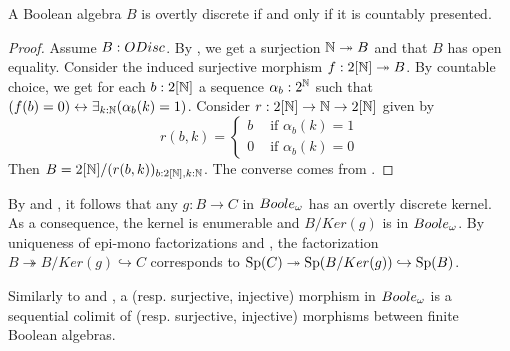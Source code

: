 \begin{corollary}\label{ODiscBAareBoole}
  A Boolean algebra $B$ is overtly discrete if and only if it is countably presented. 
\end{corollary}
\begin{proof}
  Assume $B:\ODisc$. 
  By , we get a surjection $\mathbb{N}\twoheadrightarrow B$ and that $B$ has open equality. 
  Consider the induced surjective morphism $f:2[\mathbb{N}]\twoheadrightarrow B$.
  By countable choice, we get for each $b:2[\mathbb{N}]$
  a sequence $\alpha_{b}:2^{\mathbb{N}}$ such that 
  $(f(b) = 0)\leftrightarrow \exists_{k:\mathbb{N}} (\alpha_{b}(k) =1)$. 
  Consider 
  $r:2[\mathbb{N}] \to \mathbb{N} \to 2[\mathbb{N}]$ 
  given by 
  \[r(b,k) =\begin{cases}
    b &\text{ if } \alpha_{b}(k) = 1\\
    0   &\text{ if } \alpha_{b}(k) = 0
  \end{cases}
  \] 
  Then $B= 2[\mathbb{N}]/(r(b,k))_{b:2[\mathbb{N}],k:\mathbb{N}}$.
  The converse comes from .
\end{proof}

\begin{remark}\label{BooleEpiMono}
  By  and , 
  it follows that any 
  $g:B\to C$ in $\Boole$ has an overtly discrete kernel.
  As a consequence, the kernel is enumerable and $B/Ker(g)$ is in $\Boole$. 
  By uniqueness of epi-mono factorizations and , 
  the factorization 
  $B\twoheadrightarrow B/Ker(g) \hookrightarrow C$ corresponds to 
  $\operatorname{Sp}(C) \twoheadrightarrow \operatorname{Sp}(B/Ker(g)) \hookrightarrow \operatorname{Sp}(B)$. 
\end{remark}
\begin{remark}\label{decompositionBooleMaps}
  Similarly to  and 
  , a (resp. surjective, injective) morphism
  in $\Boole$ is a sequential colimit of (resp. surjective, injective) morphisms between 
  finite Boolean algebras.
\end{remark}
